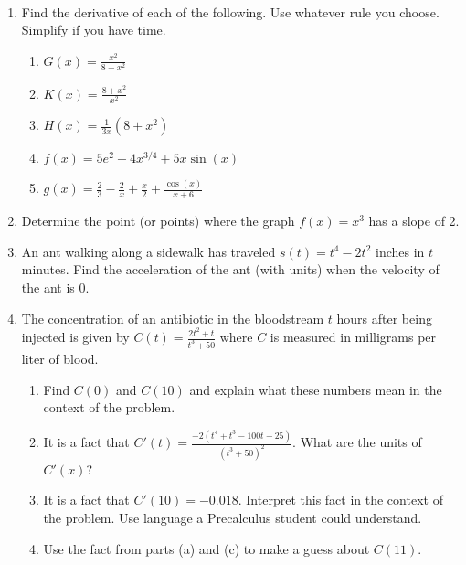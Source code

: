 \documentclass[11pt,fleqn]{article}
\begin{document}
\renewcommand{\headrulewidth}{0pt}
\newcommand{\blank}[1]{\rule{#1}{0.75pt}}
\newcommand{\bc}{\begin{center}}
\newcommand{\ec}{\end{center}}
\renewcommand{\d}{\displaystyle}

\vspace*{-0.7in}

\begin{center}
  \large
  \\
\end{center}
\begin{enumerate}
\item Find the derivative of each of the following. Use whatever rule you choose. Simplify if you have time.
	\begin{enumerate}
	\item $G(x)=\frac{x^2}{8+ x^2}$
	\vfill
	\item $K(x)=\frac{8+ x^2}{x^2}$
	\vfill
	\item $H(x)=\frac{1}{3x}(8+x^2)$
	\vfill
	\item $f(x)=5e^2+4{x}^{3/4}+5x\sin(x)$\\
	\vfill
	\item $g(x)=\frac{2}{3}-\frac{2}{x}+\frac{x}{2}+ \frac{\cos(x)}{x+6}$\\
	\vfill
	\end{enumerate}
\newpage
\item Determine the point (or points) where the graph $f(x)=x^3$ has a slope of 2. 
\vfill

\item An ant walking along a sidewalk has traveled $s(t)=t^4-2t^2$ inches in $t$ minutes.  Find the acceleration of the ant (with units) when the velocity of the ant is 0.
\vfill

\item The concentration of an antibiotic in the bloodstream $t$ hours after being injected is given by $\displaystyle{C(t)=\frac{2t^2+t}{t^3+50}}$ where $C$ is measured in milligrams per liter of blood.	
	\begin{enumerate} 
	\item Find $C(0)$ and $C(10)$ and explain what these numbers mean in the context of the problem. \\
	\vspace{.5in}
	\item It is a fact that $C'(t)=\frac{-2(t^4+t^3-100t-25)}{(t^3+50)^2}.$ What are the units of $C'(x)$?
	\vspace{.5in}
	
	\item It is a fact that $C'(10)=-0.018.$ Interpret this fact in the context of the problem. Use language a Precalculus student could understand. \\
	\vspace{.5in}
	
	\item Use the fact from parts (a) and (c) to make a guess about $C(11).$
	\vspace{.5in}
	\end{enumerate}

\end{enumerate}
\end{document}
